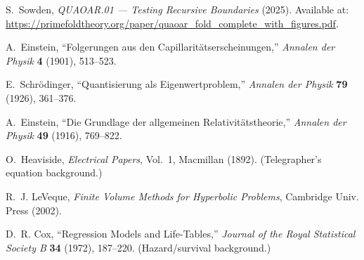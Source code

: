 \documentclass[12pt]{article}
\begin{document}
\begin{thebibliography}{99}

\begin{thebibliography}{99}
S.~Sowden, \emph{QUAOAR.01 — Testing Recursive Boundaries} (2025).
Available at: \url{https://primefoldtheory.org/paper/quaoar_fold_complete_with_figures.pdf}.
\end{thebibliography}


A.~Einstein, ``Folgerungen aus den Capillaritätserscheinungen,'' \emph{Annalen der Physik} \textbf{4} (1901), 513--523.

E.~Schr\"odinger, ``Quantisierung als Eigenwertproblem,'' \emph{Annalen der Physik} \textbf{79} (1926), 361--376.

A.~Einstein, ``Die Grundlage der allgemeinen Relativit\"atstheorie,'' \emph{Annalen der Physik} \textbf{49} (1916), 769--822.

O.~Heaviside, \emph{Electrical Papers}, Vol.~1, Macmillan (1892). (Telegrapher’s equation background.)

R.~J. LeVeque, \emph{Finite Volume Methods for Hyperbolic Problems}, Cambridge Univ. Press (2002).

D.~R. Cox, ``Regression Models and Life-Tables,'' \emph{Journal of the Royal Statistical Society B} \textbf{34} (1972), 187--220. (Hazard/survival background.)

\end{thebibliography}

\end{document}
